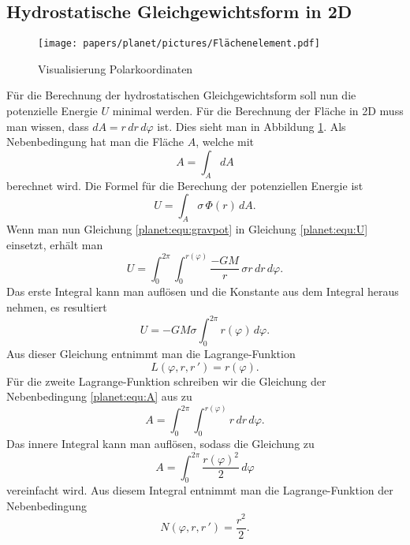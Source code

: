 \subsection{Hydrostatische Gleichgewichtsform in 2D}
\begin{figure}
	\centering
	\texttt{[image: papers/planet/pictures/Flächenelement.pdf]}
	\caption{Visualisierung Polarkoordinaten}
	\label{planet:fig:2d}
\end{figure}
Für die Berechnung der hydrostatischen Gleichgewichtsform soll nun die potenzielle Energie \(U\) minimal werden.
Für die Berechnung der Fläche in 2D muss man wissen, dass \(dA = r \, dr \, d\varphi\) ist.
Dies sieht man in Abbildung \ref{planet:fig:2d}.
Als Nebenbedingung hat man die Fläche \(A\), welche mit 
\begin{equation}
	A = \int_{A}^{} dA
	\label{planet:equ:A}
\end{equation}
berechnet wird.
Die Formel für die Berechung der potenziellen Energie ist
\begin{equation}
	U = \int_{A} \sigma \, \Phi (r) \, dA.
	\label{planet:equ:U}
\end{equation}
Wenn man nun Gleichung \eqref{planet:equ:gravpot} in Gleichung \eqref{planet:equ:U} einsetzt, erhält man
\begin{equation*}
	U = \int_{0}^{2\pi}\int_{0}^{r(\varphi)} \frac{-GM}{r} \, \sigma r \, dr \, d\varphi.
\end{equation*}
Das erste Integral kann man auflösen und die Konstante aus dem Integral heraus nehmen, es resultiert 
\begin{equation*}
	U =-GM\sigma \int_{0}^{2\pi} r(\varphi) \, d\varphi .
\end{equation*}
Aus dieser Gleichung entnimmt man die Lagrange-Funktion
\begin{equation*}
	L(\varphi ,r,r\,') = r(\varphi).
\end{equation*}
Für die zweite Lagrange-Funktion schreiben wir die Gleichung der Nebenbedingung \eqref{planet:equ:A} aus zu
\begin{equation*}
	A = \int_{0}^{2\pi}\int_{0}^{r(\varphi)} r \, dr \, d\varphi.
\end{equation*}
Das innere Integral kann man auflösen, sodass die Gleichung zu
\begin{equation*}
	A = \int_{0}^{2\pi}\frac{r(\varphi)^2}{2} \, d\varphi
\end{equation*}
vereinfacht wird.
Aus diesem Integral entnimmt man die Lagrange-Funktion der Nebenbedingung
\begin{equation*}
	N(\varphi ,r,r\,') = \frac{r^2}{2}.
\end{equation*}


